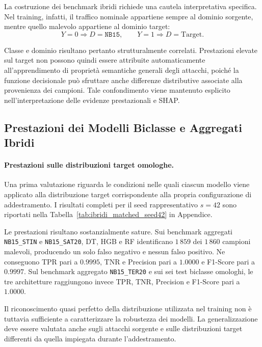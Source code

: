 La costruzione dei benchmark ibridi richiede una cautela interpretativa specifica. 
Nel training, infatti, il traffico nominale appartiene sempre al dominio sorgente, mentre quello malevolo appartiene al dominio target:
\[
    Y=0 \Rightarrow D=\texttt{NB15},
    \qquad
    Y=1 \Rightarrow D=\text{Target}.
\]

Classe e dominio risultano pertanto strutturalmente correlati. 
Prestazioni elevate sul target non possono quindi essere attribuite automaticamente all'apprendimento di proprietà semantiche generali degli attacchi, poiché la funzione decisionale può sfruttare anche differenze distributive associate alla provenienza dei campioni. 
Tale confondimento viene mantenuto esplicito nell'interpretazione delle evidenze prestazionali e SHAP.



\subsection{Prestazioni dei Modelli Biclasse e Aggregati Ibridi}
\label{subsec:ibridi_prestazioni}

\paragraph{Prestazioni sulle distribuzioni target omologhe.}
Una prima valutazione riguarda le condizioni nelle quali ciascun modello viene applicato alla distribuzione target corrispondente alla propria configurazione di addestramento. 
I risultati completi per il seed rappresentativo $s=42$ sono riportati nella Tabella~\ref{tab:ibridi_matched_seed42} in Appendice.

Le prestazioni risultano sostanzialmente sature. 
Sui benchmark aggregati \texttt{NB15\_STIN} e \newline \texttt{NB15\_SAT20}, DT, HGB e RF identificano $1\,859$ dei $1\,860$ campioni malevoli, producendo un solo falso negativo e nessun falso positivo. 
Ne conseguono TPR pari a $0.9995$, TNR e Precision pari a $1.0000$ e F1-Score pari a $0.9997$. 
Sul benchmark aggregato \texttt{NB15\_TER20} e sui sei test biclasse omologhi, le tre architetture raggiungono invece TPR, TNR, Precision e F1-Score pari a $1.0000$.

Il riconoscimento quasi perfetto della distribuzione utilizzata nel training non è tuttavia sufficiente a caratterizzare la robustezza dei modelli. 
La generalizzazione deve essere valutata anche sugli attacchi sorgente e sulle distribuzioni target differenti da quella impiegata durante l'addestramento.

